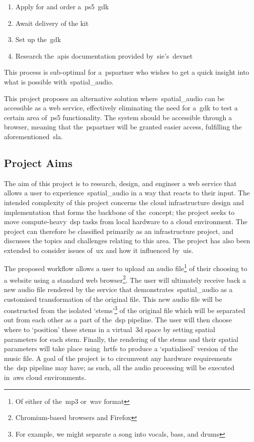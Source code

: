 \begin{enumerate}
    \item Apply for and order a~\gls{ps5}~\gls{gdk}
    \item Await delivery of the kit
    \item Set up the~\gls{gdk}
    \item Research the~\glspl{api} documentation provided by~\gls{sie}'s~\gls{devnet}
\end{enumerate}

This process is sub-optimal for a~\gls{pspartner} who wishes to get a quick insight into what is possible with~\gls{spatial_audio}.

This project proposes an alternative solution where~\gls{spatial_audio} can be accessible as a web service,
effectively eliminating the need for a~\gls{gdk} to test a certain area of~\gls{ps5} functionality.
The system should be accessible through a browser, meaning that the~\gls{pspartner} will be granted easier access, fulfilling the aforementioned~\gls{sla}.

\subsection{Project Aims}\label{subsec:aims}

The aim of this project is to research, design, and engineer a web service that allows a user to experience~\gls{spatial_audio} in a way that reacts to their input.
The intended complexity of this project concerns the cloud infrastructure design and implementation that forms the backbone of the\textit{}~concept;
the project seeks to move compute-heavy~\gls{dsp} tasks from local hardware to a cloud environment.
The project can therefore be classified primarily as an infrastructure project, and discusses the topics and challenges relating to this area.
The project has also been extended to consider issues of~\gls{ux} and how it influenced by~\glspl{ui}.

The proposed workflow allows a user
to upload an audio file\footnote{Of either of the~\gls{mp3} or~\gls{wav} format} of their choosing to a website using a standard web browser\footnote{Chromium-based browsers and Firefox}.
The user will ultimately receive back a new audio file rendered by the service that demonstrates~\gls{spatial_audio} as a customised transformation of the original file.
This new audio file will be constructed from the isolated `stems'\footnote{For example, we might separate a song into vocals, bass, and drums} of the original file which will be separated out from each other as a part of the~\gls{dsp} pipeline.
The user will then choose where to `position' these stems in a virtual~\gls{3d} space by setting spatial parameters for each stem.
Finally, the rendering of the stems and their spatial parameters will take place using~\glspl{hrtf} to produce a `spatialised' version of the music file.
A goal of the project is to circumvent any hardware requirements the~\gls{dsp} pipeline may have;
as such, all the audio processing will be executed in~\gls{aws} cloud environments.

